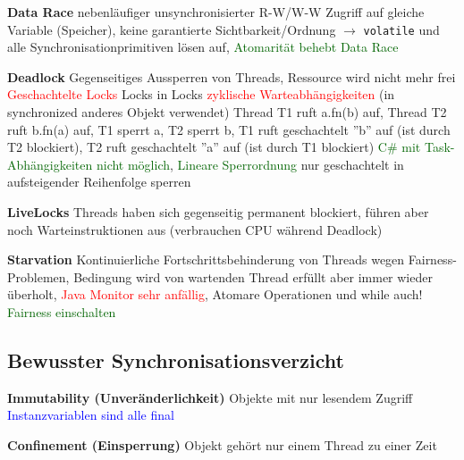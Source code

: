 \textbf{Data Race} nebenläufiger unsynchronisierter R-W/W-W Zugriff auf gleiche Variable (Speicher), keine garantierte Sichtbarkeit/Ordnung $\rightarrow$ \lstinline{volatile} und alle Synchronisationprimitiven lösen auf, \textcolor{darkGreen}{Atomarität behebt Data Race}

\textbf{Deadlock} Gegenseitiges Aussperren von Threads, Ressource wird nicht mehr frei \textcolor{red}{Geschachtelte Locks} Locks in Locks \textcolor{red}{zyklische Warteabhängigkeiten} (in synchronized anderes Objekt verwendet) Thread T1 ruft a.fn(b) auf, Thread T2 ruft b.fn(a) auf, T1 sperrt a, T2 sperrt b, T1 ruft geschachtelt ''b'' auf (ist durch T2 blockiert), T2 ruft geschachtelt ''a'' auf (ist durch T1 blockiert) \textcolor{darkGreen}{C\# mit Task-Abhängigkeiten nicht möglich}, \textcolor{darkGreen}{Lineare Sperrordnung} nur geschachtelt in aufsteigender Reihenfolge sperren

\textbf{LiveLocks} Threads haben sich gegenseitig permanent blockiert, führen aber noch Warteinstruktionen aus (verbrauchen CPU während Deadlock)

\textbf{Starvation} Kontinuierliche Fortschrittsbehinderung von Threads wegen Fairness-Problemen, Bedingung wird von wartenden Thread erfüllt aber immer wieder überholt, \textcolor{red}{Java Monitor sehr anfällig}, Atomare Operationen und while auch! \textcolor{darkGreen}{Fairness einschalten}

\subsection{Bewusster Synchronisationsverzicht}

\textbf{Immutability (Unveränderlichkeit)} Objekte mit nur lesendem Zugriff \textcolor{blue}{Instanzvariablen sind alle final}

\textbf{Confinement (Einsperrung)} Objekt gehört nur einem Thread zu einer Zeit




